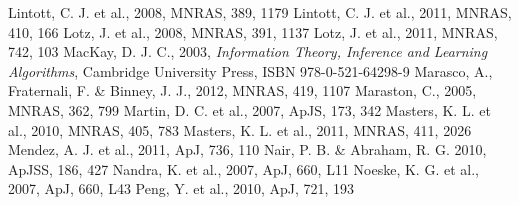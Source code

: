 \documentclass{mn2e}
\begin{document}
\begin{thebibliography}{}
 Lintott, C. J. et al., 2008, MNRAS, 389, 1179
 Lintott, C. J. et al., 2011, MNRAS, 410, 166
 Lotz, J. et al., 2008, MNRAS, 391, 1137
 Lotz, J. et al., 2011, MNRAS, 742, 103
 MacKay, D. J. C., 2003, \emph{Information Theory, Inference and Learning Algorithms}, Cambridge University Press, ISBN 978-0-521-64298-9
 Marasco, A., Fraternali, F. \& Binney, J. J., 2012, MNRAS, 419, 1107
 Maraston, C., 2005, MNRAS, 362, 799
 Martin, D. C. et al., 2007, ApJS, 173, 342
 Masters, K. L. et al., 2010, MNRAS, 405, 783
 Masters, K. L. et al., 2011, MNRAS, 411, 2026
 Mendez, A. J. et al., 2011, ApJ, 736, 110
 Nair, P. B. \& Abraham, R. G. 2010, ApJSS, 186, 427 
 Nandra, K. et al., 2007, ApJ, 660, L11
 Noeske, K. G. et al., 2007, ApJ, 660, L43
 Peng, Y. et al., 2010, ApJ, 721, 193

\end{thebibliography}
\end{document}
